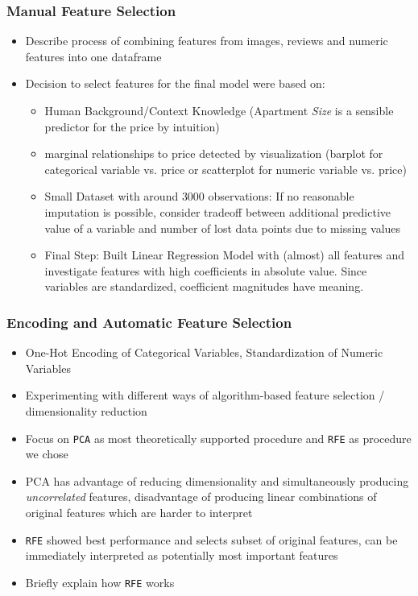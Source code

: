 \documentclass[12pt, letterpaper]{article}
\begin{document}
\subsubsection{Manual Feature Selection}
\begin{itemize}
    \item Describe process of combining features from images, reviews and numeric features into one dataframe
    \item Decision to select features for the final model were based on:
          \begin{itemize}
              \item Human Background/Context Knowledge (Apartment \emph{Size} is a sensible predictor for the price by intuition)
              \item marginal relationships to price detected by visualization (barplot for categorical variable vs. price or scatterplot for numeric variable vs. price)
              \item Small Dataset with around $3000$ observations: If no reasonable imputation is possible, consider tradeoff between additional predictive value of a variable and number of lost data points due to missing values
              \item Final Step: Built Linear Regression Model with (almost) all features and investigate features with high coefficients in absolute value.
                    Since variables are standardized, coefficient magnitudes have meaning.
          \end{itemize}
\end{itemize}


\subsubsection{Encoding and Automatic Feature Selection}
\begin{itemize}
    \item One-Hot Encoding of Categorical Variables, Standardization of Numeric Variables
    \item Experimenting with different ways of algorithm-based feature selection / dimensionality reduction
    \item Focus on \texttt{PCA} as most theoretically supported procedure and \texttt{RFE} as procedure we chose
    \item PCA has advantage of reducing dimensionality and simultaneously producing \emph{uncorrelated} features, disadvantage of producing linear combinations of original features which are harder to interpret
    \item \texttt{RFE} showed best performance and selects subset of original features, can be immediately interpreted as potentially most important features
    \item Briefly explain how \texttt{RFE} works
\end{itemize}
\end{document}
